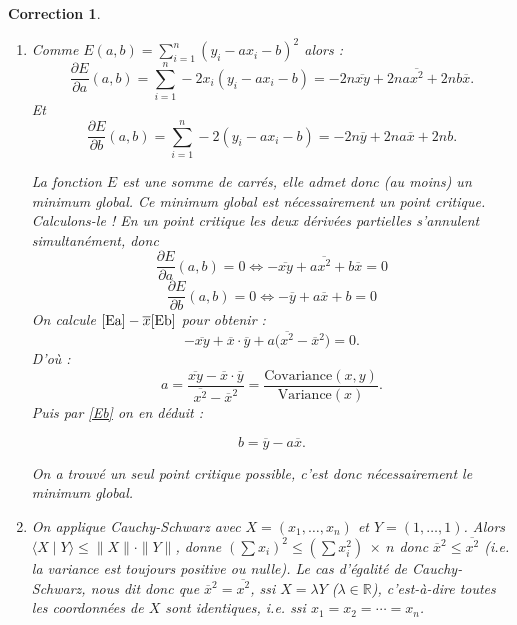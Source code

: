 \documentclass[11pt,a4paper]{article}
\newcommand{\Rr}{\mathbb{R}} \newcommand{\R}{\mathbb{R}}
\renewcommand{\le}{\leqslant} \renewcommand{\leq}{\leqslant}
\theoremstyle{exostyle}
\newtheorem{cor}{Correction}
\newcommand{\correction}{\begin{cor}} \newcommand{\fincorrection}{\end{cor}}
\begin{document}
\correction
\begin{enumerate}
	\item 
	Comme $E(a,b) = \sum_{i=1}^n (y_i-ax_i-b)^2$ alors :
	\[
	\frac{\partial E}{\partial a}(a,b) 
	= \sum_{i=1}^n -2x_i(y_i-ax_i-b)
	= -2n \overline {xy} + 2n a \overline{x^2} + 2nb \overline{x}.\]
	Et 
	\[
	\frac{\partial E}{\partial b}(a,b) 
	= \sum_{i=1}^n -2(y_i-ax_i-b)
	= -2n \overline{y} + 2n a \overline{x} +2nb.\]
		
	La fonction $E$ est une somme de carrés, elle admet donc (au moins) un minimum global.
	Ce minimum global est nécessairement un point critique. Calculons-le !
	En un point critique les deux dérivées partielles s'annulent simultanément, donc
	\begin{equation}
		\label{Ea}
		\tag{$E_a$}
	\frac{\partial E}{\partial a}(a,b)	= 0 \iff - \overline {xy} +  a \overline{x^2} + b \overline{x} = 0
	\end{equation}
	\begin{equation}
	\label{Eb}
	\tag{$E_b$}
	\frac{\partial E}{\partial b}(a,b)	= 0 \iff  - \overline{y} +  a \overline{x} + b= 0
	\end{equation}	
	On calcule $\eqref{Ea} - \overline{x} \eqref{Eb}$ pour obtenir :
	\[
	- \overline {xy}+ \overline{x} \cdot \overline{y} + a\big( \overline{x^2} -\overline{x}^2 \big) = 0.
	\]
	D'où :
	\[
	a = \frac{\overline {xy} - \overline  x \cdot \overline  y}{  \overline{x^2} - \overline{x}^2} = \frac{\text{Covariance}(x,y)}{\text{Variance}(x)}.
	\]
	Puis par \eqref{Eb} on en déduit :

	\[b= \overline  y - a \overline  x.\]
	
	On a trouvé un seul point critique possible, c'est donc nécessairement le minimum global.
	
	\item  On applique Cauchy-Schwarz avec $X = (x_1,\ldots,x_n)$ et $Y= (1,\ldots,1)$.
	Alors $\langle X \mid Y \rangle \le \| X \| \cdot \| Y \|$, donne
	$\left( \sum x_i \right)^2 \le \left(\sum x_i^2\right) \ \times \ n$
	donc $\overline{x}^2 \le \overline{x^2}$ (i.e. la variance est toujours positive ou nulle).
	Le cas d'égalité de Cauchy-Schwarz, nous dit donc que $\overline{x}^2 = \overline{x^2}$, ssi $X = \lambda Y$ ($\lambda\in\Rr$), c'est-à-dire toutes les coordonnées de $X$ sont identiques, i.e. ssi $x_1=x_2=\cdots=x_n$.
	
\end{enumerate}
\fincorrection
\finexercice
\end{document}
